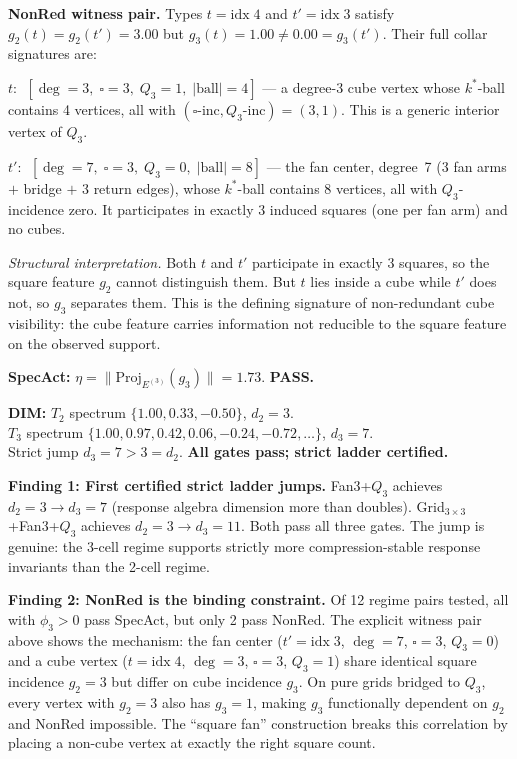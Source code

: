 \documentclass[11pt,a4paper]{article}
\theoremstyle{definition}
\theoremstyle{remark}
\begin{document}
\noindent\textbf{NonRed witness pair.}  Types $t = \text{idx}\;4$ and $t' = \text{idx}\;3$ satisfy
$g_2(t) = g_2(t') = 3.00$ but $g_3(t) = 1.00 \neq 0.00 = g_3(t')$.
Their full collar signatures are:

\smallskip\noindent
$t$: $\;[\deg\!=\!3,\;\square\!=\!3,\;Q_3\!=\!1,\;|\text{ball}|\!=\!4]$
--- a degree-3 cube vertex whose $k^*$-ball contains 4 vertices, all with
$(\square\text{-inc},Q_3\text{-inc}) = (3,1)$.  This is a generic interior vertex of $Q_3$.

\smallskip\noindent
$t'$: $\;[\deg\!=\!7,\;\square\!=\!3,\;Q_3\!=\!0,\;|\text{ball}|\!=\!8]$
--- the fan center, degree~7 (3 fan arms $+$ bridge $+$ 3 return edges),
whose $k^*$-ball contains 8 vertices, all with $Q_3$-incidence zero.
It participates in exactly 3 induced squares (one per fan arm) and no cubes.

\smallskip\noindent
\emph{Structural interpretation.}  Both $t$ and $t'$ participate in exactly 3 squares,
so the square feature $g_2$ cannot distinguish them.  But $t$ lies inside a cube
while $t'$ does not, so $g_3$ separates them.  This is the defining signature of
non-redundant cube visibility: the cube feature carries information not reducible to
the square feature on the observed support.

\smallskip\noindent
\textbf{SpecAct:} $\eta = \|\mathrm{Proj}_{E^{(3)}}(g_3)\| = 1.73$. \textbf{PASS.}

\noindent
\textbf{DIM:} $T_2$ spectrum $\{1.00, 0.33, -0.50\}$, $d_2 = 3$.\\
$T_3$ spectrum $\{1.00, 0.97, 0.42, 0.06, -0.24, -0.72, \ldots\}$, $d_3 = 7$.\\
Strict jump $d_3 = 7 > 3 = d_2$.  \textbf{All gates pass; strict ladder certified.}

\textbf{Finding 1: First certified strict ladder jumps.} Fan3+$Q_3$ achieves $d_2 = 3 \to d_3 = 7$ (response algebra dimension more than doubles). Grid$_{3\times3}$+Fan3+$Q_3$ achieves $d_2 = 3 \to d_3 = 11$. Both pass all three gates. The jump is genuine: the 3-cell regime supports strictly more compression-stable response invariants than the 2-cell regime.

\textbf{Finding 2: NonRed is the binding constraint.} Of 12 regime pairs tested, all with $\phi_3 > 0$ pass SpecAct, but only 2 pass NonRed. The explicit witness pair above shows the mechanism: the fan center ($t' = \text{idx}\;3$, $\deg = 7$, $\square = 3$, $Q_3 = 0$) and a cube vertex ($t = \text{idx}\;4$, $\deg = 3$, $\square = 3$, $Q_3 = 1$) share identical square incidence $g_2 = 3$ but differ on cube incidence $g_3$. On pure grids bridged to $Q_3$, every vertex with $g_2 = 3$ also has $g_3 = 1$, making $g_3$ functionally dependent on $g_2$ and NonRed impossible. The ``square fan'' construction breaks this correlation by placing a non-cube vertex at exactly the right square count.
\end{document}
